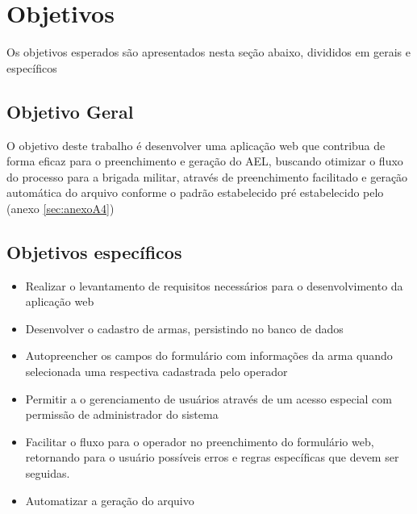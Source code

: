 \section{Objetivos}
Os objetivos esperados são apresentados nesta seção abaixo, divididos em gerais e específicos 

\subsection{Objetivo Geral}
O objetivo deste trabalho é desenvolver uma aplicação web que contribua de forma eficaz para o preenchimento e geração do AEL, buscando otimizar o fluxo do processo para a brigada militar, através de preenchimento facilitado e geração automática do arquivo conforme o padrão estabelecido pré estabelecido pelo (anexo \ref{sec:anexoA4})

\subsection{Objetivos específicos}
\begin{itemize}
    \item Realizar o levantamento de requisitos necessários para o desenvolvimento da aplicação web 
    \item Desenvolver o cadastro de armas, persistindo no banco de dados 
    \item Autopreencher os campos do formulário com informações da arma quando selecionada uma respectiva cadastrada pelo operador
    \item Permitir a o gerenciamento de usuários através de um acesso especial com permissão de administrador do sistema 
    \item Facilitar o  fluxo para o operador no preenchimento do formulário web, retornando para o usuário possíveis erros e regras específicas que devem ser seguidas.
    \item Automatizar a geração do arquivo
\end{itemize}  
